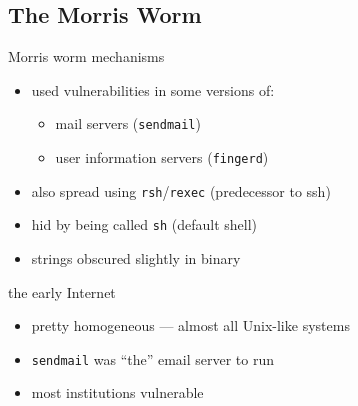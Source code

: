 \subsection{The Morris Worm}

\begin{frame}[plain]
\end{frame}

\begin{frame}[plain]
\end{frame}

\begin{frame}{Morris worm mechanisms}
\begin{itemize}
    \item used vulnerabilities in some versions of:
        \begin{itemize}
        \item mail servers ({\tt sendmail})
        \item user information servers ({\tt fingerd})
        \end{itemize}
    \item also spread using {\tt rsh}/{\tt rexec} (predecessor to ssh)
    \item hid by being called {\tt sh} (default shell)
    \item strings obscured slightly in binary
\end{itemize}
\end{frame}

\begin{frame}{the early Internet}
    \begin{itemize}
    \item pretty homogeneous --- almost all Unix-like systems
    \item {\tt sendmail} was ``the'' email server to run
    \item most institutions vulnerable
    \end{itemize}
\end{frame}

